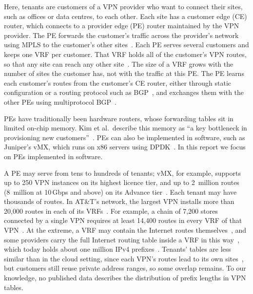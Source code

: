 \documentclass[11pt,a4paper,oneside]{report}
\begin{document}
Here, tenants are customers of a VPN provider who want to connect their sites,
such as offices or data centres, to each other. Each site has a customer edge
(CE) router, which connects to a provider edge (PE) router maintained by the VPN
provider. The PE forwards the customer's traffic across the provider's network
using MPLS to the customer's other sites~\cite{rfc4364}. Each PE serves several
customers and keeps one VRF per customer. That VRF holds all of the customer's
VPN routes, so that any site can reach any other site~\cite{kim2008relaying}.
The size of a VRF grows with the number of sites the customer has, not with the
traffic at this PE. The PE learns each customer's routes from the customer's CE
router, either through static configuration or a routing protocol such as
BGP~\cite{rfc4364}, and exchanges them with the other PEs using multiprotocol
BGP~\cite{rfc4364}.

PEs have traditionally been hardware routers, whose forwarding tables sit in
limited on-chip memory. Kim et al.\ describe this memory as ``a key bottleneck
in provisioning new customers''~\cite{kim2008relaying}. PEs can also be
implemented in software, such as Juniper's vMX, which runs on x86 servers using
DPDK~\cite{dinham2021vmx}. In this report we focus on PEs implemented in
software.

A PE may serve from tens to hundreds of tenants; vMX, for example, supports up
to 250 VPN instances on its highest licence tier, and up to 2~million routes
(8~million at 10\,Gbps and above) on its Advance tier~\cite{dinham2021vmx}. Each
tenant may have thousands of routes. In AT\&T's network, the largest VPN
installs more than 20,000 routes in each of its VRFs~\cite{kim2008relaying}. For
example, a chain of 7,200 stores connected by a single VPN requires at least
14,400 routes in every VRF of that VPN~\cite{kim2008relaying}. At the extreme, a
VRF may contain the Internet routes themselves~\cite{rfc4364}, and some
providers carry the full Internet routing table inside a VRF in this
way~\cite{tinka2015}, which today holds about one million IPv4
prefixes~\cite{huston2025}. Tenants' tables are less similar than in the cloud
setting, since each VPN's routes lead to its own sites~\cite{luo2012tcam}, but
customers still reuse private address ranges, so some overlap remains. To our
knowledge, no published data describes the distribution of prefix lengths in
VPN tables.
\end{document}
